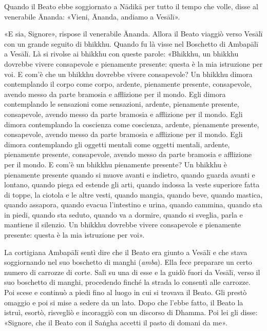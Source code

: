 
Quando il Beato ebbe soggiornato a Nādikā per tutto il tempo che volle, disse al
venerabile Ānanda: «Vieni, Ānanda, andiamo a Vesālī».

«E sia, Signore», rispose il venerabile Ānanda. Allora il Beato viaggiò verso
Vesālī con un grande seguito di bhikkhu. Quando fu là visse nel Boschetto di
Ambapālī a Vesālī. Là si rivolse ai bhikkhu con queste parole: «Bhikkhu, un
bhikkhu dovrebbe vivere consapevole e pienamente presente: questa è la mia
istruzione per voi. E com’è che un bhikkhu dovrebbe vivere consapevole? Un
bhikkhu dimora contemplando il corpo come corpo, ardente, pienamente presente,
consapevole, avendo messo da parte bramosia e afflizione per il mondo. Egli
dimora contemplando le sensazioni come sensazioni, ardente, pienamente presente,
consapevole, avendo messo da parte bramosia e afflizione per il mondo. Egli
dimora contemplando la coscienza come coscienza, ardente, pienamente presente,
consapevole, avendo messo da parte bramosia e afflizione per il mondo. Egli
dimora contemplando gli oggetti mentali come oggetti mentali, ardente,
pienamente presente, consapevole, avendo messo da parte bramosia e afflizione
per il mondo. E com’è un bhikkhu pienamente presente? Un bhikkhu è pienamente
presente quando si muove avanti e indietro, quando guarda avanti e lontano,
quando piega ed estende gli arti, quando indossa la veste superiore fatta di
toppe, la ciotola e le altre vesti, quando mangia, quando beve, quando mastica,
quando assapora, quando evacua l’intestino e urina, quando cammina, quando sta
in piedi, quando sta seduto, quando va a dormire, quando si sveglia, parla e
mantiene il silenzio. Un bhikkhu dovrebbe vivere consapevole e pienamente
presente: questa è la mia istruzione per voi».


La cortigiana Ambapālī sentì dire che il Beato era giunto a Vesālī e che stava
soggiornando nel suo boschetto di manghi (\emph{amba}). Ella fece preparare un
certo numero di carrozze di corte. Salì su una di esse e la guidò fuori da
Vesālī, verso il suo boschetto di manghi, procedendo finché la strada lo
consentì alle carrozze. Poi scese e continuò a piedi fino al luogo in cui si
trovava il Beato. Gli prestò omaggio e poi si mise a sedere da un lato. Dopo che
l’ebbe fatto, il Beato la istruì, esortò, risvegliò e incoraggiò con un discorso
di Dhamma. Poi lei gli disse: «Signore, che il Beato con il Saṅgha accetti il
pasto di domani da me».

